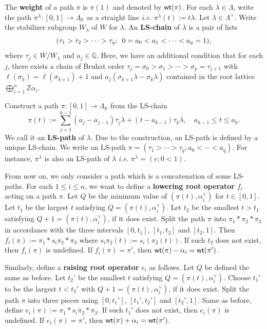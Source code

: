 \documentclass[12pt]{amsart}
\theoremstyle{definition}
\theoremstyle{remark}
\newcommand{\R}{\mathbb{R}}
\newcommand{\Z}{\mathbb{Z}}
\newcommand{\Q}{\mathbb{Q}}
\begin{document}
The \textbf{weight} of a path $\pi$ is $\pi(1)$ and denoted by ${\sf wt} (\pi)$. For each $\lambda \in \Lambda$, write the path $\pi^\lambda : [0,1] \rightarrow \Lambda_\R$ as a straight line \textit{i.e.} $\pi^\lambda (t) := t \lambda$. Let $\lambda \in \Lambda^+$. Write the stabilizer subgroup $W_\lambda$ of $W$ for $\lambda$. An \textbf{LS-chain} of $\lambda$ is a pair of lists
\begin{equation}\label{eqn3.16}
(\tau_1 > \tau_2 > \cdots > \tau_q ; \hspace{0.5em}  0 = a_0 < a_1 < \cdots < a_q = 1),
\end{equation}
where $\tau_j \in W/W_\lambda$ and $a_j \in \Q$. Here, we have an additional condition that for each $j$, there exists a chain of Bruhat order $\tau_j = \sigma_0 > \sigma_1 > \cdots > \sigma_p = \tau_{j+1}$ with $\ell (\sigma_{k} ) = \ell (\sigma_{k+1})+1$ and $a_j (\sigma_{k+1} \lambda - \sigma_k \lambda)$ contained in the root lattice $\bigoplus_{i=1}^{n} \Z \alpha_i$.

Construct a path $\pi : [0,1] \rightarrow \Lambda_\R$ from the LS-chain
\begin{equation}\label{eqn3.17}
\pi (t) := \sum_{j=1}^{k-1} (a_j - a_{j-1})\tau_j \lambda  + (t - a_{k-1})\tau_k \lambda, \quad a_{k-1} \leq t \leq a_k.
\end{equation}
We call it an \textbf{LS-path} of $\lambda$. Due to the construction, an LS-path is defined by a unique LS-chain. We write an LS-path $\pi = (\tau_1 > \cdots > \tau_q ; a_0 < \cdots < a_q)$. For instance, $\pi^\lambda$ is also an LS-path of $\lambda$ \textit{i.e.} $\pi^\lambda = (e;0<1)$.

From now on, we only consider a path which is a concatenation of some LS-paths. For each $1 \leq i \leq n$, we want to define a \textbf{lowering root operator} $f_i$ acting on a path $\pi$. Let $Q$ be the minimum value of $( \pi (t ) , \alpha_i^{\vee} )$ for $t \in [0,1]$. Let $t_1$ be the largest $t$ satisfying $Q = ( \pi (t ) , \alpha_i^{\vee} )$. Let $t_2$ be the smallest $t > t_1$ satisfying $Q+1 =  ( \pi (t ) , \alpha_i^{\vee} )$, if it does exist. Split the path $\pi$ into $\pi_1 * \pi_2 * \pi_3$ in accordance with the three intervals $[0,t_1]$, $[t_1 , t_2]$ and $[t_2 , 1]$. Then $f_i (\pi) := \pi_1 * s_i \pi_2 * \pi_3$ where $s_i \pi_2 (t):= s_i (\pi_2(t))$. If such $t_2$ does not exist, then $f_i (\pi)$ is undefined. If $f_i (\pi) = \pi'$, then ${\sf wt}(\pi) -\alpha_i= {\sf wt}(\pi')$.

Similarly, define a \textbf{raising root operator} $e_i$ as follows. Let $Q$ be defined the same as before. Let $t_2'$ be the smallest $t$ satisfying $Q = ( \pi (t ) , \alpha_i^{\vee} )$. Choose $t_1'$ to be the largest $t < t_2'$ with $Q+1 =  ( \pi (t ) , \alpha_i^{\vee} )$, if it does exist. Split the path $\pi$ into three pieces using $[0,t_1']$, $[t_1' , t_2']$ and $[t_2',1]$. Same as before, define $e_i (\pi) := \pi_1 * s_i \pi_2 * \pi_3$. If such $t_1'$ does not exist, then $e_i (\pi)$ is undefined. If $e_i (\pi) = \pi'$, then ${\sf wt}(\pi) +\alpha_i= {\sf wt}(\pi')$.
\end{document}
